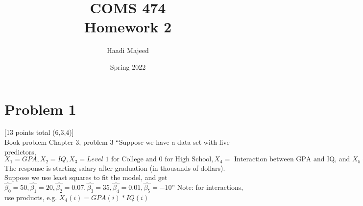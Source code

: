 \documentclass[12pt]{article}
\title{ COMS 474\\Homework 2 }
\author{ Haadi Majeed }
\date{Spring 2022}
\begin{document}
\maketitle
\pagebreak

\section*{Problem 1}
 [13 points total (6,3,4)]\\
Book problem Chapter 3, problem 3 “Suppose we have a data set with five predictors, $X_1 = GPA, X_2 = IQ, X_3 = Level \text{ 1 for College and 0 for High School}, X_4 = \text{ Interaction between GPA and IQ, and } X_5 = \text{Interaction between GPA and Level.}$  The response is starting salary after graduation (in thousands of dollars).  Suppose we use least squares to fit the model, and get $ \hat{\beta_0} = 50, \hat{\beta_1} = 20, \hat{\beta_2} = 0.07, \hat{\beta_3} = 35, \hat{\beta_4} = 0.01, \hat{\beta_5} = -10$” \newline
Note: for interactions, use products, e.g. $X_4(i) = GPA(i) * IQ(i)$
\end{document}
